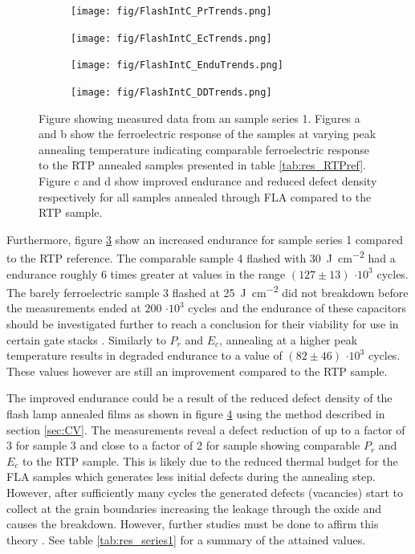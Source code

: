 \documentclass[11pt,twoside]{eitExjobb}
\begin{document}
\begin{figure}[htbp]
    \centering
    \begin{subfigure}{.4\linewidth}
        \texttt{[image: fig/FlashIntC\_PrTrends.png]}
        \caption{}\label{fig:res_IntCPr}
    \end{subfigure}
    \begin{subfigure}{.4\linewidth}
        \texttt{[image: fig/FlashIntC\_EcTrends.png]}
        \caption{}\label{fig:res_IntCEc}
    \end{subfigure}
    \begin{subfigure}{.4\linewidth}
        \texttt{[image: fig/FlashIntC\_EnduTrends.png]}
        \caption{}\label{fig:res_IntCEndu}
    \end{subfigure}
    \begin{subfigure}{.4\linewidth}
        \texttt{[image: fig/FlashIntC\_DDTrends.png]}
        \caption{}\label{fig:res_IntCDD}
    \end{subfigure}
    \caption{Figure showing measured data from an sample series 1. Figures a and
        b show the ferroelectric response of the samples at varying peak
        annealing temperature indicating comparable ferroelectric response to
        the RTP annealed samples presented in table \ref{tab:res_RTPref}.
        Figure c and d show improved endurance and reduced defect density
        respectively for all samples annealed through FLA compared to the RTP
        sample.}\label{fig:res_IntC}
\end{figure}

Furthermore, figure \ref{fig:res_IntCEndu} show an increased endurance for
sample series 1 compared to the RTP reference. The comparable sample 4 flashed
with \SI{30}{\joule\per\centi\meter\squared} had a endurance roughly 6 times
greater at values in the range $(127 \pm 13)$ $\cdot 10^3$ cycles. The barely
ferroelectric sample 3 flashed at \SI{25}{\joule\per\centi\meter\squared}
did not breakdown before the measurements ended at $200$ $\cdot 10^3$ cycles and
the endurance of these capacitors should be investigated further to reach a
conclusion for their viability for use in certain gate stacks \cite{dawber2005physics}.
Similarly to $P_r$ and $E_c$, annealing at a higher peak temperature results in degraded
endurance to a value of $(82 \pm 46)$ $\cdot 10^3$ cycles. These values however
are still an improvement compared to the RTP sample.

The improved endurance could be a result of the reduced defect density of the
flash lamp annealed films as shown in figure \ref{fig:res_IntCDD} using the
method described in section \ref{sec:CV}. The measurements reveal a defect
reduction of up to a factor of 3 for sample 3 and close to a factor of 2 for
sample showing comparable $P_r$ and $E_c$ to the RTP sample. This is likely due
to the reduced thermal budget for the FLA samples which generates less initial
defects during the annealing step. However, after sufficiently many cycles the
generated defects (vacancies) start to collect at the  grain boundaries
increasing the leakage through the oxide and causes the breakdown. However,
further studies must be done to affirm this theory \cite{pesic2016physical,
athle2022improved}. See table \ref{tab:res_series1} for a summary of the
attained values.
\end{document}
